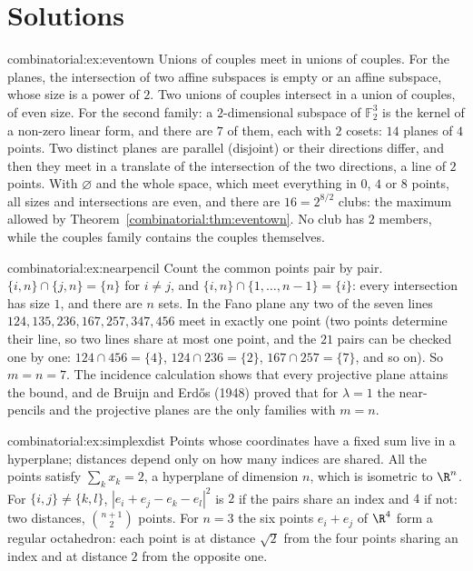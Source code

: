 \section{Solutions}

\begin{solution}{combinatorial:ex:eventown}
\idea Unions of couples meet in unions of couples. For the planes, the intersection of two affine subspaces is empty or an affine subspace, whose size is a power of $2$.
\writeup Two unions of couples intersect in a union of couples, of even size. For the second family: a $2$-dimensional subspace of $\mathbb F_2^3$ is the kernel of a non-zero linear form, and there are $7$ of them, each with
$2$ cosets: $14$ planes of $4$ points. Two distinct planes are parallel (disjoint) or their directions differ, and then they meet in a translate of the intersection of the two directions, a line of $2$ points. With
$\varnothing$ and the whole space, which meet everything in $0$, $4$ or $8$ points, all sizes and intersections are even, and there are $16=2^{8/2}$ clubs: the maximum allowed by Theorem~\ref{combinatorial:thm:eventown}. No club has $2$
members, while the couples family contains the couples themselves.
\end{solution}

\begin{solution}{combinatorial:ex:nearpencil}
\idea Count the common points pair by pair.
\writeup $\{i,n\}\cap\{j,n\}=\{n\}$ for $i\ne j$, and $\{i,n\}\cap\{1,\dots,n-1\}=\{i\}$: every intersection has size $1$, and there are $n$ sets. In the Fano plane any two of the seven lines
$124,135,236,167,257,347,456$ meet in exactly one point (two points determine their line, so two lines share at most one point, and the $21$ pairs can be checked one by one: $124\cap456=\{4\}$, $124\cap236=\{2\}$, $167\cap257=\{7\}$, and so on). So $m=n=7$. The incidence calculation shows
that every projective plane attains the bound, and de Bruijn and Erd\H os (1948) proved that for $\lambda=1$ the near-pencils and the projective planes are the only families with $m=n$.
\end{solution}

\begin{solution}{combinatorial:ex:simplexdist}
\idea Points whose coordinates have a fixed sum live in a hyperplane; distances depend only on how many indices are shared.
\writeup All the points satisfy $\sum_kx_k=2$, a hyperplane of dimension $n$, which is isometric to $\R^n$. For $\{i,j\}\ne\{k,l\}$, $|e_i+e_j-e_k-e_l|^2$ is $2$ if the pairs share an index and $4$ if not: two distances,
$\binom{n+1}2$ points. For $n=3$ the six points $e_i+e_j$ of $\R^4$ form a regular octahedron: each point is at distance $\sqrt2$ from the four points sharing an index and at distance $2$ from the opposite one.
\end{solution}

